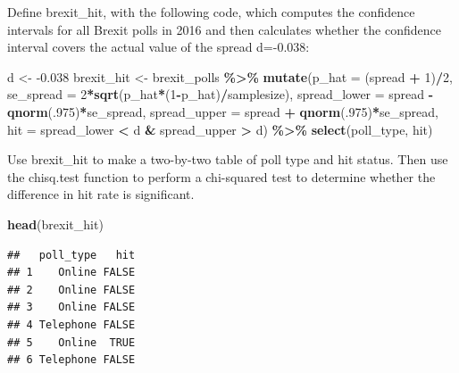 \documentclass[
]{article}
\newenvironment{Shaded}{\begin{snugshade}}{\end{snugshade}}
\newcommand{\DataTypeTok}[1]{\textcolor[rgb]{0.13,0.29,0.53}{#1}}
\newcommand{\DecValTok}[1]{\textcolor[rgb]{0.00,0.00,0.81}{#1}}
\newcommand{\FloatTok}[1]{\textcolor[rgb]{0.00,0.00,0.81}{#1}}
\newcommand{\KeywordTok}[1]{\textcolor[rgb]{0.13,0.29,0.53}{\textbf{#1}}}
\newcommand{\NormalTok}[1]{#1}
\newcommand{\OperatorTok}[1]{\textcolor[rgb]{0.81,0.36,0.00}{\textbf{#1}}}
\newcommand{\StringTok}[1]{\textcolor[rgb]{0.31,0.60,0.02}{#1}}
\begin{document}
Define brexit\_hit, with the following code, which computes the
confidence intervals for all Brexit polls in 2016 and then calculates
whether the confidence interval covers the actual value of the spread
d=-0.038:

\begin{Shaded}
\begin{Highlighting}[]
\NormalTok{d \textless{}{-}}\StringTok{ }\FloatTok{{-}0.038}
\NormalTok{brexit\_hit \textless{}{-}}\StringTok{ }\NormalTok{brexit\_polls }\OperatorTok{\%\textgreater{}\%}
\StringTok{  }\KeywordTok{mutate}\NormalTok{(}\DataTypeTok{p\_hat =}\NormalTok{ (spread }\OperatorTok{+}\StringTok{ }\DecValTok{1}\NormalTok{)}\OperatorTok{/}\DecValTok{2}\NormalTok{,}
         \DataTypeTok{se\_spread =} \DecValTok{2}\OperatorTok{*}\KeywordTok{sqrt}\NormalTok{(p\_hat}\OperatorTok{*}\NormalTok{(}\DecValTok{1}\OperatorTok{{-}}\NormalTok{p\_hat)}\OperatorTok{/}\NormalTok{samplesize),}
         \DataTypeTok{spread\_lower =}\NormalTok{ spread }\OperatorTok{{-}}\StringTok{ }\KeywordTok{qnorm}\NormalTok{(.}\DecValTok{975}\NormalTok{)}\OperatorTok{*}\NormalTok{se\_spread,}
         \DataTypeTok{spread\_upper =}\NormalTok{ spread }\OperatorTok{+}\StringTok{ }\KeywordTok{qnorm}\NormalTok{(.}\DecValTok{975}\NormalTok{)}\OperatorTok{*}\NormalTok{se\_spread,}
         \DataTypeTok{hit =}\NormalTok{ spread\_lower }\OperatorTok{\textless{}}\StringTok{ }\NormalTok{d }\OperatorTok{\&}\StringTok{ }\NormalTok{spread\_upper }\OperatorTok{\textgreater{}}\StringTok{ }\NormalTok{d) }\OperatorTok{\%\textgreater{}\%}
\StringTok{  }\KeywordTok{select}\NormalTok{(poll\_type, hit)}
\end{Highlighting}
\end{Shaded}

Use brexit\_hit to make a two-by-two table of poll type and hit status.
Then use the chisq.test function to perform a chi-squared test to
determine whether the difference in hit rate is significant.

\begin{Shaded}
\begin{Highlighting}[]
\KeywordTok{head}\NormalTok{(brexit\_hit)}
\end{Highlighting}
\end{Shaded}

\begin{verbatim}
##   poll_type   hit
## 1    Online FALSE
## 2    Online FALSE
## 3    Online FALSE
## 4 Telephone FALSE
## 5    Online  TRUE
## 6 Telephone FALSE
\end{verbatim}
\end{document}
